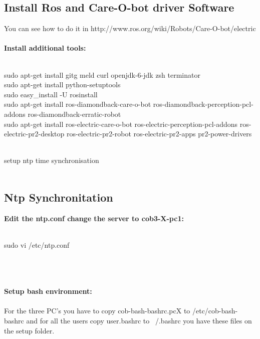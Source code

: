 \subsection{Install Ros and Care-O-bot driver Software}
You can see how to do it in http://www.ros.org/wiki/Robots/Care-O-bot/electric \\
\\

{\bf Install additional tools:}\\
\\
   \colorbox{light-gray}{
         \begin{minipage}{1.0\textwidth} 
		sudo apt-get install gitg meld curl openjdk-6-jdk zsh terminator\\
		sudo apt-get install python-setuptools\\
		sudo easy\_install -U rosinstall\\
		sudo apt-get install ros-diamondback-care-o-bot ros-diamondback-perception-pcl-addons ros-diamondback-erratic-robot\\
		sudo apt-get install ros-electric-care-o-bot ros-electric-perception-pcl-addons ros-electric-pr2-desktop ros-electric-pr2-robot ros-electric-pr2-apps pr2-power-drivers
         \end{minipage}  } \\

setup ntp time synchronisation
\\
\\
\subsection{Ntp Synchronitation}
{ \bf Edit the ntp.conf change the server to cob3-X-pc1:}\\
\\   \colorbox{light-gray}{
         \begin{minipage}{1.0\textwidth} 
		sudo vi /etc/ntp.conf 
         \end{minipage}  } \\
	\\
\\
{ \bf Setup bash environment:} \\
\\For the three PC's you have to copy cob-bash-bashrc.pcX to /etc/cob-bash-bashrc and for all the users copy user.bashrc to \ /.bashrc you have these files on the setup folder.

